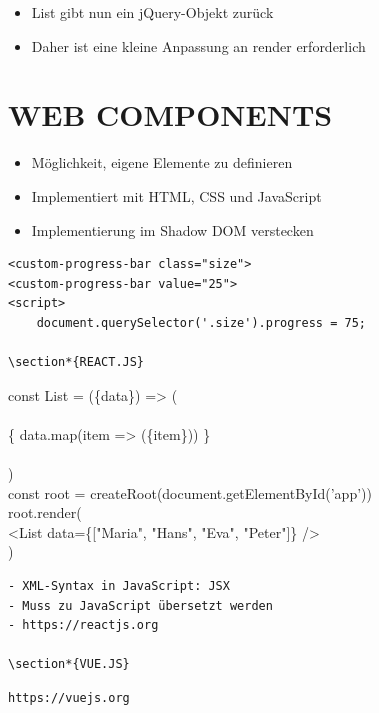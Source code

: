 \begin{itemize}
  \item List gibt nun ein jQuery-Objekt zurück
  \item Daher ist eine kleine Anpassung an render erforderlich
\end{itemize}

\section*{WEB COMPONENTS}
\begin{itemize}
  \item Möglichkeit, eigene Elemente zu definieren
  \item Implementiert mit HTML, CSS und JavaScript
  \item Implementierung im Shadow DOM verstecken
\end{itemize}

\begin{verbatim}
<custom-progress-bar class="size">
<custom-progress-bar value="25">
<script>
    document.querySelector('.size').progress = 75;

\section*{REACT.JS}
\end{verbatim}

const List = (\{data\}) => (\\
\\
\{ data.map(item => (\{item\})) \}\\
\\
)\\
const root = createRoot(document.getElementById('app'))\\
root.render(\\[0pt]
<List data=\{["Maria", "Hans", "Eva", "Peter"]\} />\\
)

\begin{verbatim}
- XML-Syntax in JavaScript: JSX
- Muss zu JavaScript übersetzt werden
- https://reactjs.org

\section*{VUE.JS}
\end{verbatim}

\begin{verbatim}
https://vuejs.org
\end{verbatim}

